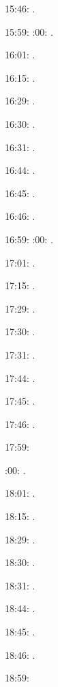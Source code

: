 \documentclass[italian]{article}
\begin{document}
15:46:     .

15:59:     
:00:    .

16:01:     . 

16:15:     . 

16:29:     . 

16:30:     .

16:31:     .

16:44:     .

16:45:     .

16:46:     .

16:59:     
:00:    .

17:01:     . 

17:15:     . 

17:29:     . 

17:30:     .

17:31:     .

17:44:     .

17:45:     .

17:46:     .

17:59:     

:00:    .

18:01:     . 

18:15:     . 

18:29:     . 

18:30:     .

18:31:     .

18:44:     .

18:45:     .

18:46:     .

18:59:     
\end{document}
